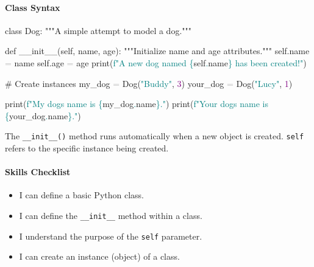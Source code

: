 \documentclass[
  justified,
  openright,
]{tufte-book}
\let\subsubsection\paragraph
\let\paragraph\paragraph
\newcommand{\BuiltInTok}[1]{#1}
\newcommand{\CommentTok}[1]{\textcolor{MidGray}{#1}}
\newcommand{\DecValTok}[1]{\textcolor{Purple}{#1}}
\newcommand{\FunctionTok}[1]{\textcolor{BrandBlue}{#1}}
\newcommand{\KeywordTok}[1]{\textcolor{BrandBlue}{#1}}
\newcommand{\NormalTok}[1]{#1}
\newcommand{\OperatorTok}[1]{\textcolor{DarkGray}{#1}}
\newcommand{\SpecialCharTok}[1]{\textcolor{Teal}{#1}}
\newcommand{\SpecialStringTok}[1]{\textcolor{Teal}{#1}}
\newcommand{\StringTok}[1]{\textcolor{Teal}{#1}}
\newcommand{\VariableTok}[1]{#1}
\newenvironment{Shaded}{%
  \begin{snugshade}
}{%
  \end{snugshade}
}
\let\subsubsection\paragraph
\let\paragraph\paragraph
\providecommand{\tightlist}{%
  \setlength{\itemsep}{0pt}\setlength{\parskip}{0pt}}
\begin{document}
\subsubsection{Class Syntax}\label{class-syntax}

\begin{Shaded}
\begin{Highlighting}[]
\KeywordTok{class}\NormalTok{ Dog:}
    \CommentTok{"""A simple attempt to model a dog."""}

    \KeywordTok{def} \FunctionTok{\_\_init\_\_}\NormalTok{(}\VariableTok{self}\NormalTok{, name, age):}
        \CommentTok{"""Initialize name and age attributes."""}
        \VariableTok{self}\NormalTok{.name }\OperatorTok{=}\NormalTok{ name}
        \VariableTok{self}\NormalTok{.age }\OperatorTok{=}\NormalTok{ age}
        \BuiltInTok{print}\NormalTok{(}\SpecialStringTok{f"A new dog named }\SpecialCharTok{\{}\VariableTok{self}\SpecialCharTok{.}\NormalTok{name}\SpecialCharTok{\}}\SpecialStringTok{ has been created!"}\NormalTok{)}

\CommentTok{\# Create instances}
\NormalTok{my\_dog }\OperatorTok{=}\NormalTok{ Dog(}\StringTok{"Buddy"}\NormalTok{, }\DecValTok{3}\NormalTok{)}
\NormalTok{your\_dog }\OperatorTok{=}\NormalTok{ Dog(}\StringTok{"Lucy"}\NormalTok{, }\DecValTok{1}\NormalTok{)}

\BuiltInTok{print}\NormalTok{(}\SpecialStringTok{f"My dog\textquotesingle{}s name is }\SpecialCharTok{\{}\NormalTok{my\_dog}\SpecialCharTok{.}\NormalTok{name}\SpecialCharTok{\}}\SpecialStringTok{."}\NormalTok{)}
\BuiltInTok{print}\NormalTok{(}\SpecialStringTok{f"Your dog\textquotesingle{}s name is }\SpecialCharTok{\{}\NormalTok{your\_dog}\SpecialCharTok{.}\NormalTok{name}\SpecialCharTok{\}}\SpecialStringTok{."}\NormalTok{)}
\end{Highlighting}
\end{Shaded}

The \texttt{\_\_init\_\_()} method runs automatically when a new object
is created. \texttt{self} refers to the specific instance being created.

\subsubsection{Skills Checklist}\label{skills-checklist-33}

\begin{itemize}
\tightlist
\item[$\square$]
  I can define a basic Python class.
\item[$\square$]
  I can define the \texttt{\_\_init\_\_} method within a class.
\item[$\square$]
  I understand the purpose of the \texttt{self} parameter.
\item[$\square$]
  I can create an instance (object) of a class.
\end{itemize}
\end{document}
